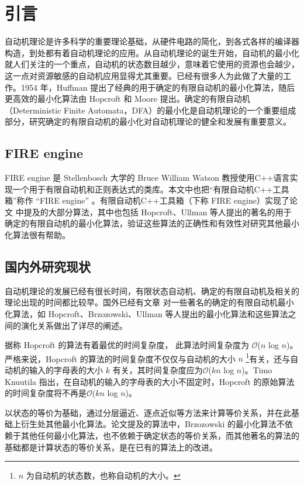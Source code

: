 \chapter{引言}
自动机理论是许多科学的重要理论基础，从硬件电路的简化，到各式各样的编译器构造，到处都有着自动机理论的应用。从自动机理论的诞生开始，自动机的最小化就人们关注的一个重点，自动机的状态数目越少，意味着它使用的资源也会越少，这一点对资源敏感的自动机应用显得尤其重要。已经有很多人为此做了大量的工作。1954 年，Huffman 提出了经典的用于确定的有限自动机的最小化算法\cite{HUFFMAN1954161}，随后更高效的最小化算法由 Hopcroft 和 Moore 提出。确定的有限自动机（Deterministic Finite Automata，DFA）的最小化是自动机理论的一个重要组成部分，研究确定的有限自动机的最小化对自动机理论的健全和发展有重要意义。

\section{FIRE engine}
FIRE engine \cite{watson1994design}是 Stellenbosch 大学的 Bruce William Watson 教授使用C++语言实现一个用于有限自动机和正则表达式的类库。本文中也把“有限自动机C++工具箱”称作 “FIRE engine” 。有限自动机C++工具箱（下称 FIRE engine）实现了论文 \cite{watson1993taxonomya,watson1993taxonomyb} 中提及的大部分算法，其中也包括 Hopcroft、Ullman 等人提出的著名的用于确定的有限自动机的最小化算法，验证这些算法的正确性和有效性对研究其他最小化算法很有帮助。

\section{国内外研究现状}

自动机理论的发展已经有很长时间，有限状态自动机、确定的有限自动机及相关的理论出现的时间都比较早。国外已经有文章 \cite{watson1993taxonomyb} 对一些著名的确定的有限自动机最小化算法，如 Hopcroft、Brzozowski、Ullman 等人提出的最小化算法和这些算法之间的演化关系做出了详尽的阐述。

据称 Hopcroft 的算法有着最优的时间复杂度， 此算法时间复杂度为 $\mathcal{O}$($n$ log $n$)\cite{Hopc71}。严格来说，Hopcroft 的算法的时间复杂度不仅仅与自动机的大小 $n$ \footnote{ $n$ 为自动机的状态数，也称自动机的大小。}有关，还与自动机的输入的字母表的大小 $k$ 有关，其时间复杂度应为$\mathcal{O}$($kn$ log $n$)。Timo Knuutila 指出，在自动机的输入的字母表的大小不固定时，Hopcroft 的原始算法的时间复杂度将不再是$\mathcal{O}$($kn$ log $n$)\cite{KNUUTILA2001333}。

以状态的等价为基础，通过分层逼近、逐点近似等方法来计算等价关系，并在此基础上衍生处其他最小化算法。论文\cite{watson1993taxonomyb}提及的算法中，Brzozowski 的最小化算法不依赖于其他任何最小化算法，也不依赖于确定状态的等价关系，而其他著名的算法的基础都是计算状态的等价关系，是在已有的算法上的改进\cite{watson1993taxonomyb}。

